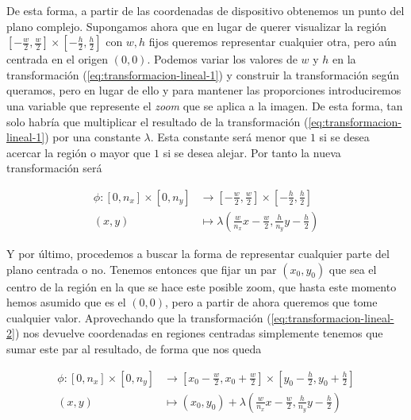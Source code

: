 De esta forma, a partir de las coordenadas de dispositivo obtenemos un punto del plano complejo. Supongamos ahora que en lugar de querer visualizar la región $\left[-\frac{w}{2},\frac{w}{2}\right]\times\left[-\frac{h}{2},\frac{h}{2}\right]$ con $w,h$ fijos queremos representar cualquier otra, pero aún centrada en el origen $(0,0)$. Podemos variar los valores de $w$ y $h$ en la transformación (\ref{eq:transformacion-lineal-1}) y construir la transformación según queramos, pero en lugar de ello y para mantener las proporciones introduciremos una variable que represente el \textit{zoom} que se aplica a la imagen. De esta forma, tan solo habría que multiplicar el resultado de la transformación (\ref{eq:transformacion-lineal-1}) por una constante $\lambda$. Esta constante será menor que $1$ si se desea acercar la región o mayor que $1$ si se desea alejar. Por tanto la nueva transformación será

\begin{equation}
    \label{eq:transformacion-lineal-2}
    \begin{split}
        \phi:[0,n_x]\times[0,n_y] & \longrightarrow \left[-\frac{w}{2},\frac{w}{2}\right]\times\left[-\frac{h}{2},\frac{h}{2}\right] \\
        (x,y) & \longmapsto \lambda\left(\frac{w}{n_x}x-\frac{w}{2},\frac{h}{n_y}y-\frac{h}{2}\right)
    \end{split}
\end{equation}

Y por último, procedemos a buscar la forma de representar cualquier parte del plano centrada o no. Tenemos entonces que fijar un par $(x_0,y_0)$ que sea el centro de la región en la que se hace este posible zoom, que hasta este momento hemos asumido que es el $(0,0)$, pero a partir de ahora queremos que tome cualquier valor. Aprovechando que la transformación (\ref{eq:transformacion-lineal-2}) nos devuelve coordenadas en regiones centradas simplemente tenemos que sumar este par al resultado, de forma que nos queda 

\begin{equation}
    \label{eq:transformacion-lineal-3}
    \begin{split}
        \phi:[0,n_x]\times[0,n_y] & \longrightarrow \left[x_0-\frac{w}{2},x_0+\frac{w}{2}\right]\times\left[y_0-\frac{h}{2},y_0+\frac{h}{2}\right] \\
        (x,y) & \longmapsto (x_0,y_0) + \lambda\left(\frac{w}{n_x}x-\frac{w}{2},\frac{h}{n_y}y-\frac{h}{2}\right)
    \end{split}
\end{equation}

